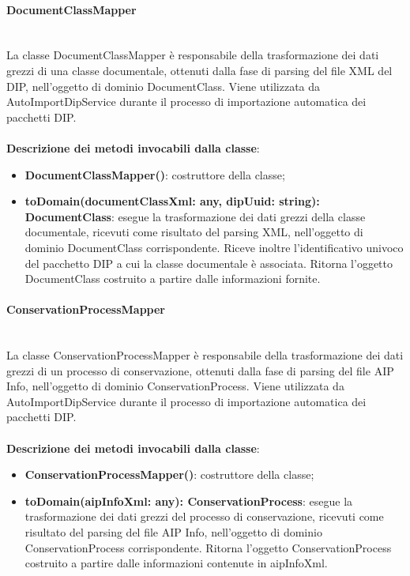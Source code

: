 \documentclass[a4paper,12pt]{article}
\begin{document}
{                \paragraph{DocumentClassMapper}\label{par:DocumentClassMapper}\mbox{}\\
                La classe DocumentClassMapper è responsabile della trasformazione dei dati grezzi di una classe documentale, ottenuti dalla fase di parsing del file XML del DIP, nell'oggetto di dominio DocumentClass. Viene utilizzata da AutoImportDipService durante il processo di importazione automatica dei pacchetti DIP.\\
                \\
                \noindent \textbf{Descrizione dei metodi invocabili dalla classe}:
                \begin{itemize}
                    \item \textbf{DocumentClassMapper()}: costruttore della classe;
                    \item \textbf{toDomain(documentClassXml: any, dipUuid: string): DocumentClass}: esegue la trasformazione dei dati grezzi della classe documentale, ricevuti come risultato del parsing XML, nell'oggetto di dominio DocumentClass corrispondente. Riceve inoltre l'identificativo univoco del pacchetto DIP a cui la classe documentale è associata. Ritorna l'oggetto DocumentClass costruito a partire dalle informazioni fornite.
                \end{itemize}

                \paragraph{ConservationProcessMapper}\label{par:ConservationProcessMapper}\mbox{}\\
                La classe ConservationProcessMapper è responsabile della trasformazione dei dati grezzi di un processo di conservazione, ottenuti dalla fase di parsing del file AIP Info, nell'oggetto di dominio ConservationProcess. Viene utilizzata da AutoImportDipService durante il processo di importazione automatica dei pacchetti DIP.\\
                \\
                \noindent \textbf{Descrizione dei metodi invocabili dalla classe}:
                \begin{itemize}
                    \item \textbf{ConservationProcessMapper()}: costruttore della classe;
                    \item \textbf{toDomain(aipInfoXml: any): ConservationProcess}: esegue la trasformazione dei dati grezzi del processo di conservazione, ricevuti come risultato del parsing del file AIP Info, nell'oggetto di dominio ConservationProcess corrispondente. Ritorna l'oggetto ConservationProcess costruito a partire dalle informazioni contenute in aipInfoXml.
                \end{itemize}

}
\end{document}
